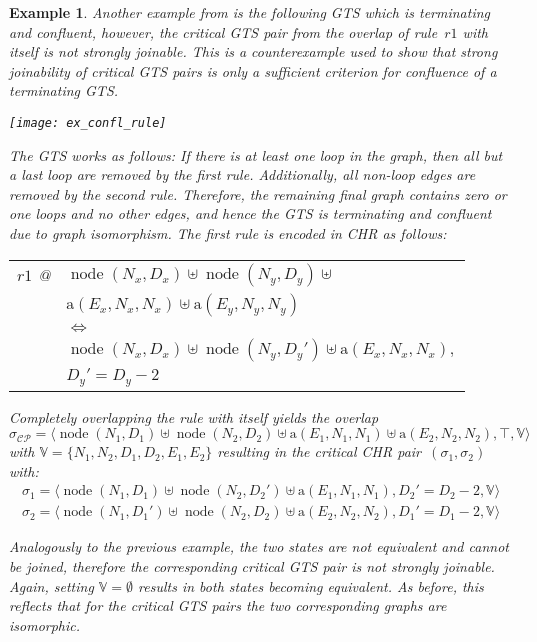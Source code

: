 \documentclass{tlp}
\newtheorem{example}{Example}[section]
\newcommand{\st}[3]{\ensuremath{\langle #1 , #2 , #3 \rangle}}
\newcommand{\mcCP}{\ensuremath{\mathcal{CP}}}
\newcommand{\bbV}{\ensuremath{\mathbb{V}}}
\newcommand{\sigcp}{\ensuremath{\sigma_{\mcCP}}}
\DeclareMathOperator{\node}{node}
\begin{document}
\begin{example}\label{ex:counterexample}
Another example from \cite{plump05} is the following GTS which is terminating and
confluent, however, the critical GTS pair from the overlap of rule~$r1$ with
itself is not strongly joinable. This is a counterexample used to show that
strong joinability of critical GTS pairs is only a sufficient criterion for
confluence of a terminating GTS.

\begin{center} 
\texttt{[image: ex\_confl\_rule]}
\end{center}

The GTS works as follows: If there is at least one loop in the graph, then all
but a last loop are removed by the first rule. Additionally, all non-loop edges
are removed by the second rule. Therefore, the remaining final graph contains
zero or one loops and no other edges, and hence the GTS is terminating and
confluent due to graph isomorphism. The first rule is encoded in CHR as follows:

\begin{center} 
\begin{tabular}{ll}
$r1$ @ & $\node(N_x, D_x) \uplus \node(N_y, D_y) \uplus$\\
& $\text{a}(E_x, N_x, N_x) \uplus \text{a}(E_y, N_y, N_y)$ \\
& $\Leftrightarrow$ \\
& $\node(N_x, D_x) \uplus \node(N_y, D_y') \uplus \text{a}(E_x, N_x, N_x),$\\
& $D_y' = D_y - 2$
\end{tabular}
\end{center}

Completely overlapping the rule with itself yields the overlap \[\sigcp =
\st{\node(N_1, D_1) \uplus \node(N_2, D_2) \uplus \text{a}(E_1, N_1, N_1) \uplus
\text{a}(E_2, N_2, N_2)}{\top}{\bbV}\] with $\bbV = \{N_1, N_2, D_1,
D_2, E_1, E_2\}$ resulting in the critical CHR pair~$(\sigma_1, \sigma_2)$ with:
\[
\begin{array}{l}
\sigma_1 = \st{\node(N_1, D_1) \uplus \node(N_2, D_2') \uplus \text{a}(E_1, N_1,
N_1)}{D_2' = D_2 - 2}{\bbV}\\
\sigma_2 = \st{\node(N_1, D_1') \uplus \node(N_2, D_2)\uplus \text{a}(E_2, N_2,
N_2)}{D_1' = D_1 - 2}{\bbV}
\end{array}
\]

Analogously to the previous example, the two states are not equivalent and cannot
be joined, therefore the corresponding critical GTS pair is not strongly
joinable. Again, setting $\bbV = \emptyset$ results in both states becoming
equivalent. As before, this reflects that for the critical GTS pairs the two
corresponding graphs are isomorphic.
\end{example}
\end{document}
